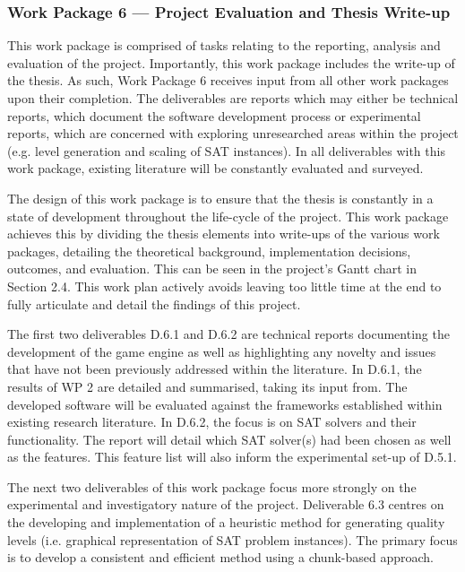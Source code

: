 \documentclass[a4paper]{article}
\begin{document}
\subsubsection{Work Package 6 --- Project Evaluation and Thesis Write-up}

This work package is comprised of tasks relating to the reporting, analysis and evaluation of the
project. Importantly, this work package includes the write-up of the thesis. As such, Work Package 6
receives input from all other work packages upon their completion. The deliverables are reports
which may either be technical reports, which document the software development process or
experimental reports, which are concerned with exploring unresearched areas within the project (e.g.
level generation and scaling of SAT instances). In all deliverables with this work package, existing
literature will be constantly evaluated and surveyed.

The design of this work package is to ensure that the thesis is constantly in a state of development
throughout the life-cycle of the project. This work package achieves this by dividing the thesis
elements into write-ups of the various work packages, detailing the theoretical background,
implementation decisions, outcomes, and evaluation. This can be seen in the project's Gantt chart in
Section 2.4. This work plan actively avoids leaving too little time at the end to fully articulate
and detail the findings of this project.

The first two deliverables D.6.1 and D.6.2 are technical reports documenting the development of the
game engine as well as highlighting any novelty and issues that have not been previously addressed
within the literature. In D.6.1, the results of WP 2 are detailed and summarised, taking its input
from. The developed software will be evaluated against the frameworks established within existing
research literature. In D.6.2, the focus is on SAT solvers and their functionality. The report will
detail which SAT solver(s) had been chosen as well as the features. This feature list will also
inform the experimental set-up of D.5.1.

The next two deliverables of this work package focus more strongly on the experimental and
investigatory nature of the project. Deliverable 6.3 centres on the developing and implementation of
a heuristic method for generating quality levels (i.e. graphical representation of SAT problem
instances). The primary focus is to develop a consistent and efficient method using a chunk-based
approach.
\end{document}

